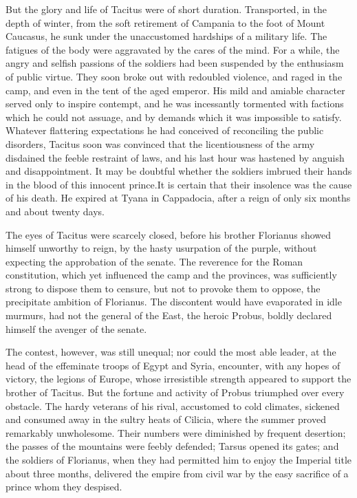 But the glory and life of Tacitus were of short duration.
Transported, in the depth of winter, from the soft retirement of
Campania to the foot of Mount Caucasus, he sunk under the
unaccustomed hardships of a military life. The fatigues of the
body were aggravated by the cares of the mind. For a while, the
angry and selfish passions of the soldiers had been suspended by
the enthusiasm of public virtue. They soon broke out with
redoubled violence, and raged in the camp, and even in the tent
of the aged emperor. His mild and amiable character served only
to inspire contempt, and he was incessantly tormented with
factions which he could not assuage, and by demands which it was
impossible to satisfy. Whatever flattering expectations he had
conceived of reconciling the public disorders, Tacitus soon was
convinced that the licentiousness of the army disdained the
feeble restraint of laws, and his last hour was hastened by
anguish and disappointment. It may be doubtful whether the
soldiers imbrued their hands in the blood of this innocent
prince.\footnotemark[18] It is certain that their insolence was the cause of
his death. He expired at Tyana in Cappadocia, after a reign of
only six months and about twenty days.\footnotemark[19]



The eyes of Tacitus were scarcely closed, before his brother
Florianus showed himself unworthy to reign, by the hasty
usurpation of the purple, without expecting the approbation of
the senate. The reverence for the Roman constitution, which yet
influenced the camp and the provinces, was sufficiently strong to
dispose them to censure, but not to provoke them to oppose, the
precipitate ambition of Florianus. The discontent would have
evaporated in idle murmurs, had not the general of the East, the
heroic Probus, boldly declared himself the avenger of the senate.

The contest, however, was still unequal; nor could the most able
leader, at the head of the effeminate troops of Egypt and Syria,
encounter, with any hopes of victory, the legions of Europe,
whose irresistible strength appeared to support the brother of
Tacitus. But the fortune and activity of Probus triumphed over
every obstacle. The hardy veterans of his rival, accustomed to
cold climates, sickened and consumed away in the sultry heats of
Cilicia, where the summer proved remarkably unwholesome. Their
numbers were diminished by frequent desertion; the passes of the
mountains were feebly defended; Tarsus opened its gates; and the
soldiers of Florianus, when they had permitted him to enjoy the
Imperial title about three months, delivered the empire from
civil war by the easy sacrifice of a prince whom they despised.\footnotemark[20]

